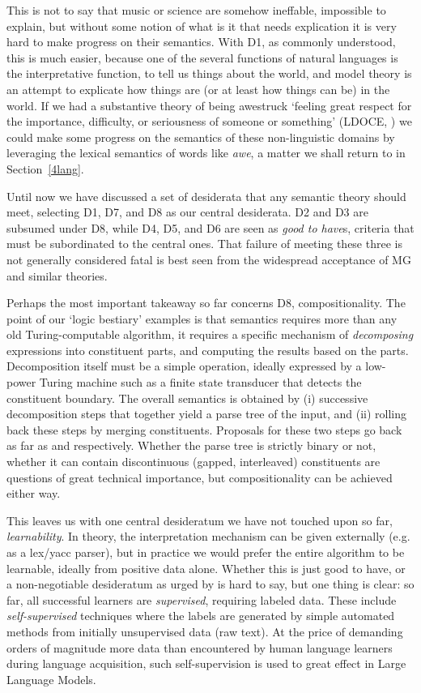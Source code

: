 \documentclass[output=paper,colorlinks=true,citecolor=brown]{langscibook}
\begin{document}
This is not to say that music or science are somehow ineffable, impossible to
explain, but without some notion of what is it that needs explication it is
very hard to make progress on their semantics. With D1, as commonly
understood, this is much easier, because one of the several functions of
natural languages is the interpretative function, to tell us things about the
world, and model theory is an attempt to explicate how things are (or at least
how things can be) in the world. If we had a substantive theory of being
awestruck `feeling great respect for the importance, difficulty, or
seriousness of someone or something' (LDOCE, \cite{Procter:1978}) we could
make some progress on the semantics of these non-linguistic domains by
leveraging the lexical semantics of words like \emph{awe}, a matter we shall
return to in Section~\ref{4lang}.

\medskip\noindent Until now we have discussed a set of desiderata that any
semantic theory should meet, selecting D1, D7, and D8 as our central
desiderata. D2 and D3 are subsumed under D8, while D4, D5, and D6 are seen as
\emph{good to have}s, criteria that must be subordinated to the central
ones. That failure of meeting these three is not generally considered fatal is
best seen from the widespread acceptance of MG and similar theories.

Perhaps the most important takeaway so far concerns D8, compositionality. The
point of our `logic bestiary' examples is that semantics requires more than
any old Turing-computable algorithm, it requires a specific mechanism of \emph{  decomposing} expressions into constituent parts, and computing the results
based on the parts. Decomposition itself must be a simple operation, ideally
expressed by a low-power Turing machine such as a finite state transducer that
detects the constituent boundary. The overall semantics is obtained by (i)
successive decomposition steps that together yield a parse tree of the input,
and (ii) rolling back these steps by merging constituents. Proposals for these
two steps go back as far as \citet{Wells:1947} and \citet{Knuth:1968}
respectively. Whether the parse tree is strictly binary or not, whether it can
contain discontinuous (gapped, interleaved) constituents are questions of
great technical importance, but compositionality can be achieved either way.

This leaves us with one central desideratum we have not touched upon so far,
\emph{learnability}. In theory, the interpretation mechanism can be given
externally (e.g. as a lex/yacc parser), but in practice we would prefer the
entire algorithm to be learnable, ideally from positive data alone. Whether
this is just good to have, or a non-negotiable desideratum as urged by
\citet{Chomsky:1965} is hard to say, but one thing is clear: so far, all
successful learners are \emph{supervised}, requiring labeled data. These
include \emph{self-supervised} techniques where the labels are generated by
simple automated methods from initially unsupervised data (raw text). At the
price of demanding orders of magnitude more data than encountered by human
language learners during language acquisition, such self-supervision is used
to great effect in Large Language Models.
\end{document}
